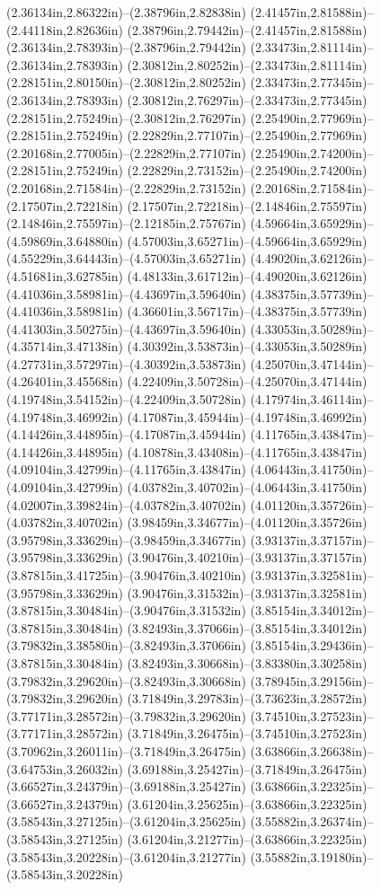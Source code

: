 (2.36134in,2.86322in)--(2.38796in,2.82838in) (2.41457in,2.81588in)--(2.44118in,2.82636in) (2.38796in,2.79442in)--(2.41457in,2.81588in) (2.36134in,2.78393in)--(2.38796in,2.79442in) (2.33473in,2.81114in)--(2.36134in,2.78393in) (2.30812in,2.80252in)--(2.33473in,2.81114in) (2.28151in,2.80150in)--(2.30812in,2.80252in) (2.33473in,2.77345in)--(2.36134in,2.78393in) (2.30812in,2.76297in)--(2.33473in,2.77345in) (2.28151in,2.75249in)--(2.30812in,2.76297in) (2.25490in,2.77969in)--(2.28151in,2.75249in) (2.22829in,2.77107in)--(2.25490in,2.77969in) (2.20168in,2.77005in)--(2.22829in,2.77107in) (2.25490in,2.74200in)--(2.28151in,2.75249in) (2.22829in,2.73152in)--(2.25490in,2.74200in) (2.20168in,2.71584in)--(2.22829in,2.73152in) (2.20168in,2.71584in)--(2.17507in,2.72218in) (2.17507in,2.72218in)--(2.14846in,2.75597in) (2.14846in,2.75597in)--(2.12185in,2.75767in) (4.59664in,3.65929in)--(4.59869in,3.64880in) (4.57003in,3.65271in)--(4.59664in,3.65929in) (4.55229in,3.64443in)--(4.57003in,3.65271in) (4.49020in,3.62126in)--(4.51681in,3.62785in) (4.48133in,3.61712in)--(4.49020in,3.62126in) (4.41036in,3.58981in)--(4.43697in,3.59640in) (4.38375in,3.57739in)--(4.41036in,3.58981in) (4.36601in,3.56717in)--(4.38375in,3.57739in) (4.41303in,3.50275in)--(4.43697in,3.59640in) (4.33053in,3.50289in)--(4.35714in,3.47138in) (4.30392in,3.53873in)--(4.33053in,3.50289in) (4.27731in,3.57297in)--(4.30392in,3.53873in) (4.25070in,3.47144in)--(4.26401in,3.45568in) (4.22409in,3.50728in)--(4.25070in,3.47144in) (4.19748in,3.54152in)--(4.22409in,3.50728in) (4.17974in,3.46114in)--(4.19748in,3.46992in) (4.17087in,3.45944in)--(4.19748in,3.46992in) (4.14426in,3.44895in)--(4.17087in,3.45944in) (4.11765in,3.43847in)--(4.14426in,3.44895in) (4.10878in,3.43408in)--(4.11765in,3.43847in) (4.09104in,3.42799in)--(4.11765in,3.43847in) (4.06443in,3.41750in)--(4.09104in,3.42799in) (4.03782in,3.40702in)--(4.06443in,3.41750in) (4.02007in,3.39824in)--(4.03782in,3.40702in) (4.01120in,3.35726in)--(4.03782in,3.40702in) (3.98459in,3.34677in)--(4.01120in,3.35726in) (3.95798in,3.33629in)--(3.98459in,3.34677in) (3.93137in,3.37157in)--(3.95798in,3.33629in) (3.90476in,3.40210in)--(3.93137in,3.37157in) (3.87815in,3.41725in)--(3.90476in,3.40210in) (3.93137in,3.32581in)--(3.95798in,3.33629in) (3.90476in,3.31532in)--(3.93137in,3.32581in) (3.87815in,3.30484in)--(3.90476in,3.31532in) (3.85154in,3.34012in)--(3.87815in,3.30484in) (3.82493in,3.37066in)--(3.85154in,3.34012in) (3.79832in,3.38580in)--(3.82493in,3.37066in) (3.85154in,3.29436in)--(3.87815in,3.30484in) (3.82493in,3.30668in)--(3.83380in,3.30258in) (3.79832in,3.29620in)--(3.82493in,3.30668in) (3.78945in,3.29156in)--(3.79832in,3.29620in) (3.71849in,3.29783in)--(3.73623in,3.28572in) (3.77171in,3.28572in)--(3.79832in,3.29620in) (3.74510in,3.27523in)--(3.77171in,3.28572in) (3.71849in,3.26475in)--(3.74510in,3.27523in) (3.70962in,3.26011in)--(3.71849in,3.26475in) (3.63866in,3.26638in)--(3.64753in,3.26032in) (3.69188in,3.25427in)--(3.71849in,3.26475in) (3.66527in,3.24379in)--(3.69188in,3.25427in) (3.63866in,3.22325in)--(3.66527in,3.24379in) (3.61204in,3.25625in)--(3.63866in,3.22325in) (3.58543in,3.27125in)--(3.61204in,3.25625in) (3.55882in,3.26374in)--(3.58543in,3.27125in) (3.61204in,3.21277in)--(3.63866in,3.22325in) (3.58543in,3.20228in)--(3.61204in,3.21277in) (3.55882in,3.19180in)--(3.58543in,3.20228in) 